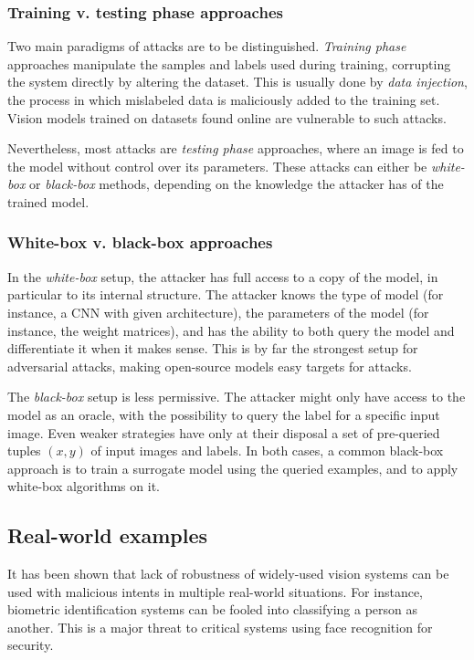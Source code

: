 \documentclass[twocolumn]{../cs-classes/cs-classes}
\begin{document}
\subsubsection{Training v. testing phase approaches}
Two main paradigms of attacks are to be distinguished. \emph{Training phase} approaches manipulate the samples and labels used during training, corrupting the system directly by altering the dataset. This is usually done by \emph{data injection}, the process in which mislabeled data is maliciously added to the training set. Vision models trained on datasets found online are vulnerable to such attacks. 

Nevertheless, most attacks are \emph{testing phase} approaches, where an image is fed to the model without control over its parameters. These attacks can either be \emph{white-box} or \emph{black-box} methods, depending on the knowledge the attacker has of the trained model.

\subsubsection{White-box v. black-box approaches}
In the \emph{white-box} setup, the attacker has full access to a copy of the model, in particular to its internal structure. The attacker knows the type of model (for instance, a CNN with given architecture), the parameters of the model (for instance, the weight matrices), and has the ability to both query the model and differentiate it when it makes sense. This is by far the strongest setup for adversarial attacks, making open-source models easy targets for attacks.

The \emph{black-box} setup is less permissive. The attacker might only have access to the model as an oracle, with the possibility to query the label for a specific input image. Even weaker strategies have only at their disposal a set of pre-queried tuples $(x, y)$ of input images and labels. In both cases, a common black-box approach is to train a surrogate model using the queried examples, and to apply white-box algorithms on it.

\subsection{Real-world examples}
It has been shown that lack of robustness of widely-used vision systems can be used with malicious intents in multiple real-world situations. For instance, biometric identification systems can be fooled into classifying a person as another. This is a major threat to critical systems using face recognition for security. 
\end{document}
